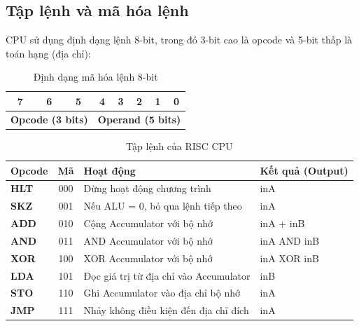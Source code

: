 \subsection{Tập lệnh và mã hóa lệnh}
CPU sử dụng định dạng lệnh 8-bit, trong đó 3-bit cao là opcode và 5-bit thấp là toán hạng (địa chỉ):

\begin{table}[H]
\centering
\begin{tabular}{|c|c|c|c|c|c|c|c|}
\hline
7 & 6 & 5 & 4 & 3 & 2 & 1 & 0 \\ \hline
\multicolumn{3}{|c|}{\textbf{Opcode (3 bits)}} & \multicolumn{5}{c|}{\textbf{Operand (5 bits)}} \\ \hline
\end{tabular}
\caption{Định dạng mã hóa lệnh 8-bit}
\end{table}

\begin{table}[H]
\centering
\renewcommand{\arraystretch}{1.2}
\small
\setlength{\tabcolsep}{3pt}
\begin{tabular}{|l|c|l|l|}
\hline
\textbf{Opcode} & \textbf{Mã} & \textbf{Hoạt động} & \textbf{Kết quả (Output)} \\ \hline
\textbf{HLT} & 000 & Dừng hoạt động chương trình & inA \\ \hline
\textbf{SKZ} & 001 & Nếu ALU = 0, bỏ qua lệnh tiếp theo & inA \\ \hline
\textbf{ADD} & 010 & Cộng Accumulator với bộ nhớ & inA + inB \\ \hline
\textbf{AND} & 011 & AND Accumulator với bộ nhớ & inA AND inB \\ \hline
\textbf{XOR} & 100 & XOR Accumulator với bộ nhớ & inA XOR inB \\ \hline
\textbf{LDA} & 101 & Đọc giá trị từ địa chỉ vào Accumulator & inB \\ \hline
\textbf{STO} & 110 & Ghi Accumulator vào địa chỉ bộ nhớ & inA \\ \hline
\textbf{JMP} & 111 & Nhảy không điều kiện đến địa chỉ đích & inA \\ \hline
\end{tabular}
\caption{Tập lệnh của RISC CPU}
\end{table}

